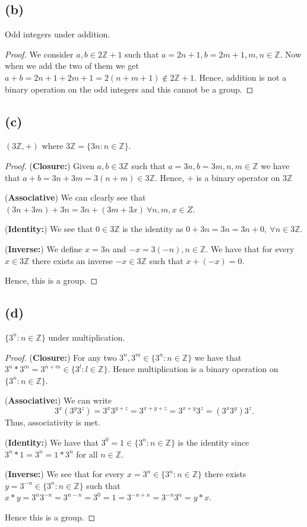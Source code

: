 \documentclass{article}
\newcommand{\Z}{\mathbb{Z}}
\begin{document}
\subsection*{(b)}
Odd integers under addition.
\begin{proof}
    We consider $a, b \in 2\Z + 1$ such that $a = 2n + 1, b = 2m + 1,
        m,n \in \Z$. Now when we add the two of them we get
    $a + b = 2n + 1 + 2m + 1 = 2(n + m + 1) \notin 2\Z + 1$. Hence,
    addition is not a binary operation on the odd integers and this cannot
    be a group.
\end{proof}

\subsection*{(c)}
$(3\Z, +)$ where $3\Z = \{3n: n\in\Z\}$.
\begin{proof}
    (\textbf{Closure:})
    Given $a,b \in 3\Z$ such that $a = 3n, b = 3m, n,m \in \Z$
    we have that $a + b = 3n + 3m = 3(n + m) \in 3\Z$. Hence,
    $+$ is a binary operator on $3\Z$

    (\textbf{Associative}) We can clearly see that $(3n + 3m) + 3n = 3n + (3m + 3x) \ \forall n,m,x \in Z$.

    (\textbf{Identity:}) We see that $0 \in 3\Z$ is the identity as $0 + 3n = 3n = 3n + 0, \ \forall n \in 3\Z$.

    (\textbf{Inverse:}) We define $x = 3n$ and $-x = 3(-n), n \in \Z$.
    We have that for every $x \in 3\Z$ there exists an inverse $-x \in 3\Z$
    such that $x + (-x) = 0$.

    Hence, this is a group.
\end{proof}

\subsection*{(d)}
$\{3^n: n \in \Z\}$ under multiplication.
\begin{proof}
    (\textbf{Closure:})
    For any two $3^n, 3^m \in \{3^n: n \in \Z\}$ we have that
    $3^n*3^m = 3^{n+m} \in \{3^l: l \in \Z\}$. Hence multiplication is a binary
    operation on $\{3^n: n \in \Z\}$.

    (\textbf{Associative:})
    We can write
    \[3^x(3^y3^z) = 3^x3^{y+z} = 3^{x+y+z} = 3^{x+y}3^z =  (3^x3^y)3^z.\]
    Thus, associativity is met.

    (\textbf{Identity:})
    We have that $3^0 = 1 \in \{3^n: n \in \Z\}$ is the identity since $3^n * 1 = 3^n = 1*3^n$
    for all $n \in \Z$.

    (\textbf{Inverse:})
    We see that for every $x = 3^n \in \{3^n: n \in \Z\}$ there exists $y = 3^{-n} \in \{3^n: n \in \Z\}$
    such that $x*y = 3^n3^{-n} = 3^{n-n} = 3^0 = 1 = 3^{-n+n} = 3^{-n}3^n = y*x$.

    Hence this is a group.
\end{proof}
\end{document}
